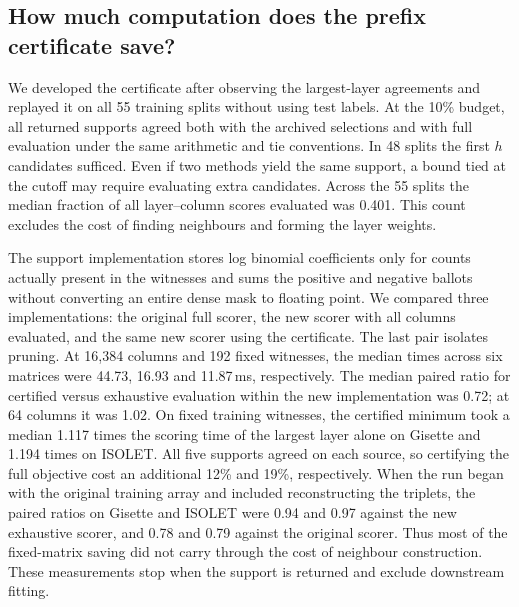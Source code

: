 \subsection{How much computation does the prefix certificate save?}
We developed the certificate after observing the largest-layer agreements and replayed it on all 55 training splits without using test labels. At the 10\% budget, all returned supports agreed both with the archived selections and with full evaluation under the same arithmetic and tie conventions. In 48 splits the first $h$ candidates sufficed. Even if two methods yield the same support, a bound tied at the cutoff may require evaluating extra candidates. Across the 55 splits the median fraction of all layer--column scores evaluated was 0.401. This count excludes the cost of finding neighbours and forming the layer weights.

The support implementation stores log binomial coefficients only for counts actually present in the witnesses and sums the positive and negative ballots without converting an entire dense mask to floating point. We compared three implementations: the original full scorer, the new scorer with all columns evaluated, and the same new scorer using the certificate. The last pair isolates pruning. At 16,384 columns and 192 fixed witnesses, the median times across six matrices were 44.73, 16.93 and 11.87\,ms, respectively. The median paired ratio for certified versus exhaustive evaluation within the new implementation was 0.72; at 64 columns it was 1.02. On fixed training witnesses, the certified minimum took a median 1.117 times the scoring time of the largest layer alone on Gisette and 1.194 times on ISOLET. All five supports agreed on each source, so certifying the full objective cost an additional 12\% and 19\%, respectively. When the run began with the original training array and included reconstructing the triplets, the paired ratios on Gisette and ISOLET were 0.94 and 0.97 against the new exhaustive scorer, and 0.78 and 0.79 against the original scorer. Thus most of the fixed-matrix saving did not carry through the cost of neighbour construction. These measurements stop when the support is returned and exclude downstream fitting.
